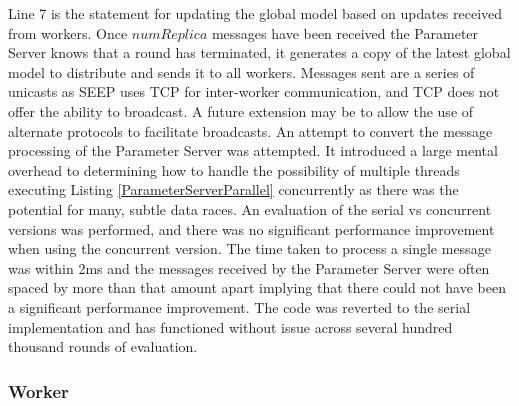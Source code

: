 \documentclass[12pt]{article}
\begin{document}
Line 7 is the statement for updating the global model based on updates received from workers. Once $numReplica$ messages have been received the Parameter Server knows that a round has terminated, it generates a copy of the latest global model to distribute and sends it to all workers. Messages sent are a series of unicasts as SEEP uses TCP for inter-worker communication, and TCP does not offer the ability to broadcast. A future extension may be to allow the use of alternate protocols to facilitate broadcasts.
\newline
\newline
An attempt to convert the message processing of the Parameter Server was attempted. It introduced a large mental overhead to determining how to handle the possibility of multiple threads executing Listing \ref{ParameterServerParallel} concurrently as there was the potential for many, subtle data races. An evaluation of the serial vs concurrent versions was performed, and there was no significant performance improvement when using the concurrent version. The time taken to process a single message was within 2ms and the messages received by the Parameter Server were often spaced by more than that amount apart implying that there could not have been a significant performance improvement. The code was reverted to the serial implementation and has functioned without issue across several hundred thousand rounds of evaluation.

\subsubsection{Worker}
\end{document}
